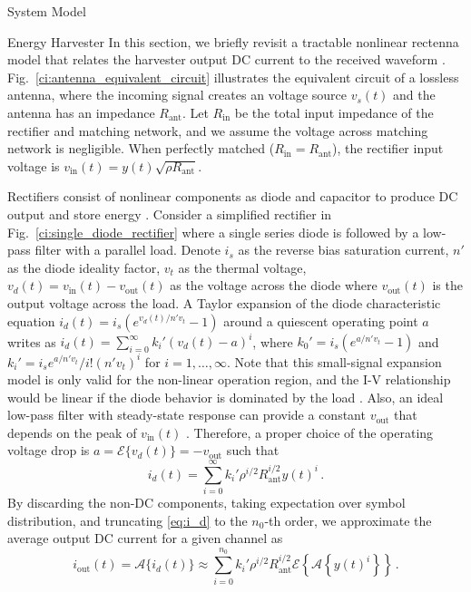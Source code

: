 \documentclass[journal]{IEEEtran}
\begin{document}
\begin{section}{System Model}
\begin{subsection}{Energy Harvester}
			In this section, we briefly revisit a tractable nonlinear rectenna model that relates the harvester output DC current to the received waveform \cite{Clerckx2016a,Clerckx2018b}. Fig.~\ref{ci:antenna_equivalent_circuit} illustrates the equivalent circuit of a lossless antenna, where the incoming signal creates an voltage source $v_s(t)$ and the antenna has an impedance $R_{\text{ant}}$. Let $R_{\text{in}}$ be the total input impedance of the rectifier and matching network, and we assume the voltage across matching network is negligible. When perfectly matched ($R_{\text{in}}=R_{\text{ant}}$), the rectifier input voltage is $v_{\text{in}}(t)=y(t)\sqrt{\rho R_{\text{ant}}}$.

			Rectifiers consist of nonlinear components as diode and capacitor to produce DC output and store energy \cite{Hagerty2004,Pinuela2013}. Consider a simplified rectifier in Fig.~\ref{ci:single_diode_rectifier} where a single series diode is followed by a low-pass filter with a parallel load. Denote $i_s$ as the reverse bias saturation current, $n'$ as the diode ideality factor, $v_t$ as the thermal voltage, $v_d(t)=v_{\text{in}}(t)-v_{\text{out}}(t)$ as the voltage across the diode where $v_{\text{out}}(t)$ is the output voltage across the load. A Taylor expansion of the diode characteristic equation $i_d(t)=i_s(e^{v_d(t)/n' v_t}-1)$ around a quiescent operating point $a$ writes as $i_d(t)=\sum_{i=0}^{\infty}k_i'(v_d(t)-a)^i$, where $k_0'=i_s(e^{a/n' v_t}-1)$ and $k_i'=i_se^{a/n'v_t}/i!(n'v_t)^i$ for $i=1,\dots,\infty$. Note that this small-signal expansion model is only valid for the non-linear operation region, and the I-V relationship would be linear if the diode behavior is dominated by the load \cite{Clerckx2016a}. Also, an ideal low-pass filter with steady-state response can provide a constant $v_{\text{out}}$ that depends on the peak of $v_{\text{in}}(t)$ \cite{Curty2005}. Therefore, a proper choice of the operating voltage drop is $a=\mathcal{E}\{v_d(t)\}=-v_{\text{out}}$ such that
			\begin{equation}\label{eq:i_d}
				i_d(t)=\sum_{i=0}^{\infty}k_i'\rho^{i/2}R_{\text{ant}}^{i/2}y(t)^i\,.
			\end{equation}
			By discarding the non-DC components, taking expectation over symbol distribution, and truncating \ref{eq:i_d} to the $n_0$-th order, we approximate the average output DC current for a given channel as
			\begin{equation}\label{eq:i_out}
				i_{\text{out}}(t)=\mathcal{A}\{i_d(t)\}\approx\sum_{i=0}^{n_0}{k_i'}{\rho^{i/2}}{R_{\text{ant}}^{i/2}}\mathcal{E}\left\{{\mathcal{A}\left\{y(t)^i\right\}}\right\}\,.

\end{equation}
\end{subsection}
\end{section}
\end{document}

